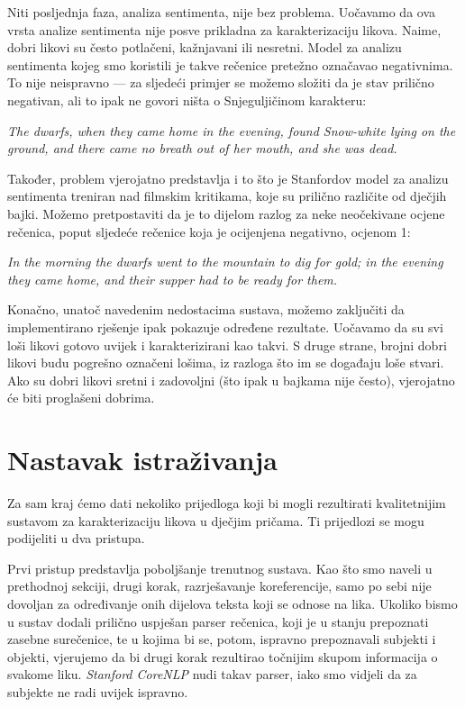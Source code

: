 \documentclass[a4paper,twoside,12pt]{memoir} %
\newcommand{\ti}[1]{\textit{#1\/}}
\begin{document}
		\bigskip

		Niti posljednja faza, analiza sentimenta, nije bez problema. Uočavamo da ova vrsta analize sentimenta nije posve prikladna za karakterizaciju likova. Naime, dobri likovi su često potlačeni, kažnjavani ili nesretni. Model za analizu sentimenta kojeg smo koristili je takve rečenice pretežno označavao negativnima. To nije neispravno --- za sljedeći primjer se možemo složiti da je stav prilično negativan, ali to ipak ne govori ništa o Snjeguljičinom karakteru:

		\begin{displayquote}
			\ti{The dwarfs, when they came home in the evening, found Snow-white lying on the ground, and there came no breath out of her mouth, and she was dead.}
		\end{displayquote}

		Također, problem vjerojatno predstavlja i to što je Stanfordov model za analizu sentimenta treniran nad filmskim kritikama, koje su prilično različite od dječjih bajki. Možemo pretpostaviti da je to dijelom razlog za neke neočekivane ocjene rečenica, poput sljedeće rečenice koja je ocijenjena negativno, ocjenom 1:

		\begin{displayquote}
			\ti{In the morning the dwarfs went to the mountain to dig for
			gold; in the evening they came home, and their supper had to be ready
			for them.}
		\end{displayquote}

		\bigskip

		Konačno, unatoč navedenim nedostacima sustava, možemo zaključiti da implementirano rješenje ipak pokazuje određene rezultate. Uočavamo da su svi loši likovi gotovo uvijek i karakterizirani kao takvi. S druge strane, brojni dobri likovi budu pogrešno označeni lošima, iz razloga što im se događaju loše stvari. Ako su dobri likovi sretni i zadovoljni (što ipak u bajkama nije često), vjerojatno će biti proglašeni dobrima.


	\section{Nastavak istraživanja}

		Za sam kraj ćemo dati nekoliko prijedloga koji bi mogli rezultirati kvalitetnijim sustavom za karakterizaciju likova u dječjim pričama. Ti prijedlozi se mogu podijeliti u dva pristupa.

		\bigskip

		Prvi pristup predstavlja poboljšanje trenutnog sustava. Kao što smo naveli u prethodnoj sekciji, drugi korak, razrješavanje koreferencije, samo po sebi nije dovoljan za određivanje onih dijelova teksta koji se odnose na lika. Ukoliko bismo u sustav dodali prilično uspješan parser rečenica, koji je u stanju prepoznati zasebne surečenice, te u kojima bi se, potom, ispravno prepoznavali subjekti i objekti, vjerujemo da bi drugi korak rezultirao točnijim skupom informacija o svakome liku. \ti{Stanford CoreNLP} nudi takav parser, iako smo vidjeli da za subjekte ne radi uvijek ispravno.
\end{document}

